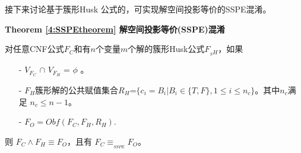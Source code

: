%
%
接下来讨论基于簇形Husk 公式的，可实现解空间投影等价的SSPE混淆。

\textbf{Theorem \ref{4:SSPEtheorem} 解空间投影等价(SSPE)混淆}

对任意CNF公式$F_C$和有$n$个变量$m$个解的簇形Husk公式$F_{_SH}$，如果
\begin{enumerate}
 \item[-] $V_{F_C}$ $\cap$ $V_{F_H}$ = $\phi$ 。
 \item[-] $F_H$簇形解的公共赋值集合$R_H$=$\{c_i=B_i| B_i \in \{T,F\}, 1\leqslant i\leqslant n_c\}$。其中$n_c$满足 $n_c \leqslant n-1$。 
 \item[-] $F_O=Obf(F_C,F_H,R_H)$.
\end{enumerate}
则 $F_C\wedge F_H \equiv F_O$，且有 $F_C \equiv_{_{SSPE}} F_O$。

